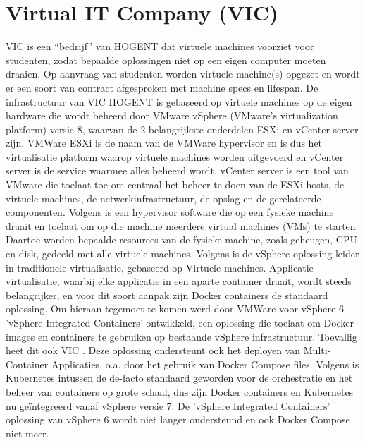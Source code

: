 \section{Virtual IT Company (VIC)}
VIC is een ``bedrijf'' van HOGENT dat virtuele machines voorziet voor studenten, zodat bepaalde oplossingen niet op een eigen computer moeten draaien. Op aanvraag van studenten worden virtuele machine(s) opgezet en wordt er een soort van contract afgesproken met machine specs en lifespan.
\newline
\newline
De infrastructuur van VIC HOGENT is gebaseerd op virtuele machines op de eigen hardware die wordt beheerd door VMware vSphere (VMware's virtualization platform) versie 8, waarvan de 2 belangrijkste onderdelen ESXi en vCenter server zijn.
\newline
VMWare ESXi is de naam van de VMWare hypervisor en is dus het virtualisatie platform waarop virtuele machines worden uitgevoerd en vCenter server is de service waarmee alles beheerd wordt.
\newline
vCenter server is een tool van VMware die toelaat toe om centraal het beheer te doen van de ESXi hosts, de virtuele machines, de netwerkinfrastructuur, de opslag en de gerelateerde componenten.
\newline
Volgens \textcite{VMware2023a} is een hypervisor software die op een fysieke machine draait en toelaat om op die machine meerdere virtual machines (VMs) te starten. Daartoe worden bepaalde resources van de fysieke machine, zoals geheugen, CPU en disk, gedeeld met alle virtuele machines.
\newline
Volgens \textcite{VMware2023b} is de vSphere oplossing leider in traditionele virtualisatie, gebaseerd op Virtuele machines.
\newline
Applicatie virtualisatie, waarbij elke applicatie in een aparte container draait, wordt steeds belangrijker, en voor dit soort aanpak zijn Docker containers de standaard oplossing. Om hieraan tegemoet te komen werd door VMWare voor vSphere 6 'vSphere Integrated Containers' ontwikkeld, een oplossing die toelaat om Docker images en containers te gebruiken op bestaande vSphere infrastructuur. Toevallig heet dit ook VIC \autocite{VMware2023b}.
Deze oplossing ondersteunt ook het deployen van Multi-Container Applicaties, o.a. door het gebruik van Docker Compose files.
\newline
\newline
Volgens \textcite{VMware2021} is Kubernetes intussen de de-facto standaard geworden voor de orchestratie en het beheer van containers op grote schaal, dus zijn Docker containers en Kubernetes nu geïntegreerd vanaf vSphere versie 7. De 'vSphere Integrated Containers' oplossing van vSphere 6 wordt niet langer ondersteund en ook Docker Compose niet meer.
